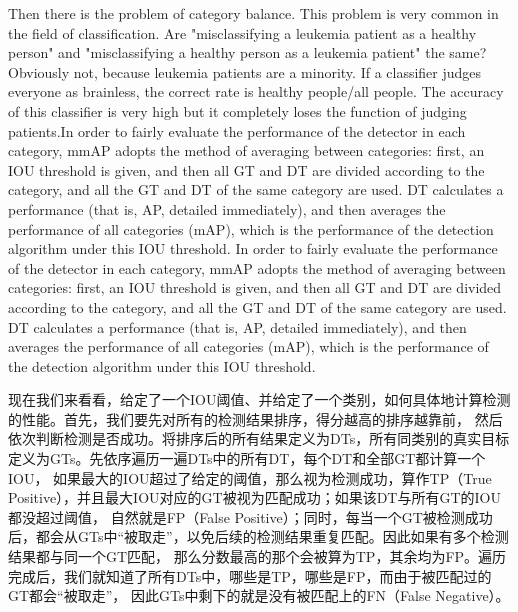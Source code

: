 \documentclass[UTF8]{ctexart}
\begin{document}
Then there is the problem of category balance. This problem is very common in the field of classification. 
Are "misclassifying a leukemia patient as a healthy person" and "misclassifying a healthy person as a leukemia 
patient" the same? Obviously not, because leukemia patients are a minority. If a classifier judges everyone as 
brainless, the correct rate is healthy people/all people. The accuracy of this classifier is very high but it 
completely loses the function of judging patients.In order to fairly evaluate the performance of the detector 
in each category, mmAP adopts the method of averaging between categories: first, an IOU threshold is given, 
and then all GT and DT are divided according to the category, and all the GT and DT of the same category are used. 
DT calculates a performance (that is, AP, detailed immediately), and then averages the performance of all categories (mAP), 
which is the performance of the detection algorithm under this IOU threshold. In order to fairly evaluate the performance of
the detector in each category, mmAP adopts the method of averaging between categories: first, an IOU threshold is given, 
and then all GT and DT are divided according to the category, and all the GT and DT of the same category are used. DT 
calculates a performance (that is, AP, detailed immediately), and then averages the performance of all categories (mAP), 
which is the performance of the detection algorithm under this IOU threshold.

现在我们来看看，给定了一个IOU阈值、并给定了一个类别，如何具体地计算检测的性能。首先，我们要先对所有的检测结果排序，得分越高的排序越靠前，
然后依次判断检测是否成功。将排序后的所有结果定义为DTs，所有同类别的真实目标定义为GTs。先依序遍历一遍DTs中的所有DT，每个DT和全部GT都计算一个IOU，
如果最大的IOU超过了给定的阈值，那么视为检测成功，算作TP（True Positive），并且最大IOU对应的GT被视为匹配成功；如果该DT与所有GT的IOU都没超过阈值，
自然就是FP（False Positive）；同时，每当一个GT被检测成功后，都会从GTs中“被取走”，以免后续的检测结果重复匹配。因此如果有多个检测结果都与同一个GT匹配，
那么分数最高的那个会被算为TP，其余均为FP。遍历完成后，我们就知道了所有DTs中，哪些是TP，哪些是FP，而由于被匹配过的GT都会“被取走”，
因此GTs中剩下的就是没有被匹配上的FN（False Negative）。
\end{document}
